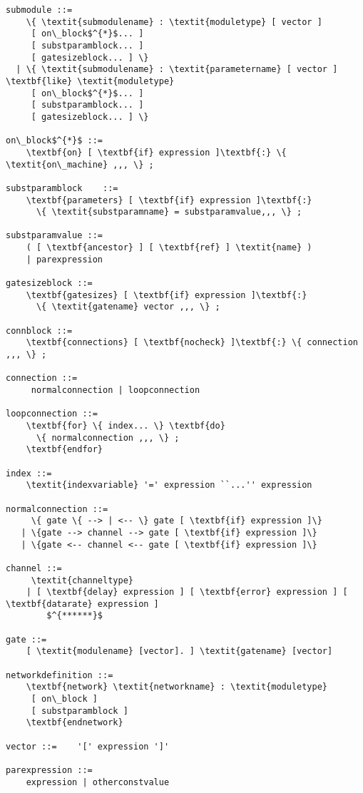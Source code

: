 \begin{Verbatim}[commandchars=\\\{\}]
submodule ::=
    \{ \textit{submodulename} : \textit{moduletype} [ vector ]
     [ on\_block$^{*}$... ]
     [ substparamblock... ]
     [ gatesizeblock... ] \}
  | \{ \textit{submodulename} : \textit{parametername} [ vector ] \textbf{like} \textit{moduletype}
     [ on\_block$^{*}$... ]
     [ substparamblock... ]
     [ gatesizeblock... ] \}

on\_block$^{*}$ ::=
    \textbf{on} [ \textbf{if} expression ]\textbf{:} \{ \textit{on\_machine} ,,, \} ;

substparamblock    ::=
    \textbf{parameters} [ \textbf{if} expression ]\textbf{:}
      \{ \textit{substparamname} = substparamvalue,,, \} ;

substparamvalue ::=
    ( [ \textbf{ancestor} ] [ \textbf{ref} ] \textit{name} )
    | parexpression

gatesizeblock ::=
    \textbf{gatesizes} [ \textbf{if} expression ]\textbf{:}
      \{ \textit{gatename} vector ,,, \} ;

connblock ::=
    \textbf{connections} [ \textbf{nocheck} ]\textbf{:} \{ connection ,,, \} ;

connection ::=
     normalconnection | loopconnection

loopconnection ::=
    \textbf{for} \{ index... \} \textbf{do}
      \{ normalconnection ,,, \} ;
    \textbf{endfor}

index ::=
    \textit{indexvariable} '=' expression ``...'' expression

normalconnection ::=
     \{ gate \{ --> | <-- \} gate [ \textbf{if} expression ]\}
   | \{gate --> channel --> gate [ \textbf{if} expression ]\}
   | \{gate <-- channel <-- gate [ \textbf{if} expression ]\}

channel ::=
     \textit{channeltype}
    | [ \textbf{delay} expression ] [ \textbf{error} expression ] [ \textbf{datarate} expression ]
        $^{******}$

gate ::=
    [ \textit{modulename} [vector]. ] \textit{gatename} [vector]

networkdefinition ::=
    \textbf{network} \textit{networkname} : \textit{moduletype}
     [ on\_block ]
     [ substparamblock ]
    \textbf{endnetwork}

vector ::=    '[' expression ']'

parexpression ::=
    expression | otherconstvalue


\end{Verbatim}
